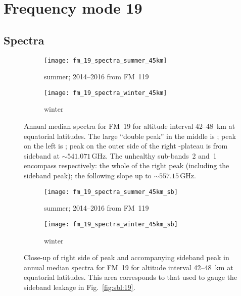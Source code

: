 \section{Frequency mode 19}
\label{FM19}
\subsection{Spectra}
\label{FM19:spectra}

\begin{figure}[ht]
    \centering
    \begin{subfigure}[b]{0.9545\textwidth}
        \texttt{[image: fm\_19\_spectra\_summer\_45km]}
        \caption{summer; 2014--2016 from FM~119}\label{fig:spectra:19:summer}
    \end{subfigure}
    \begin{subfigure}[b]{0.9545\textwidth}
        \texttt{[image: fm\_19\_spectra\_winter\_45km]}
        \caption{winter}\label{fig:spectra:19:winter}
    \end{subfigure}
    \caption{Annual median spectra for FM~19 for altitude interval 42--48~km
        at equatorial latitudes.  The large ``double peak'' in the middle is
        ; peak on the left is ; peak on the outer side of
        the right -plateau is  from sideband at
        $\sim541.071\,\mathrm{GHz}$.  The unhealthy sub-bands~2 and~1 encompass
        respectively: the whole of the right  peak (including the
        sideband peak); the following slope up to $\sim557.15\,\mathrm{GHz}$.
        }\label{fig:spectra:19}
\end{figure}

\begin{figure}[ht]
    \centering
    \begin{subfigure}[b]{0.9545\textwidth}
        \texttt{[image: fm\_19\_spectra\_summer\_45km\_sb]}
        \caption{summer; 2014--2016 from FM~119
            }\label{fig:spectra:19:summer:closeup}
    \end{subfigure}
    \begin{subfigure}[b]{0.9545\textwidth}
        \texttt{[image: fm\_19\_spectra\_winter\_45km\_sb]}
        \caption{winter}\label{fig:spectra:19:winter:closeup}
    \end{subfigure}
    \caption{Close-up of right side of  peak and accompanying
        sideband  peak in annual median spectra for FM~19
        for altitude interval 42--48~km at equatorial latitudes.  This area
        corresponds to that used to gauge the sideband leakage in
        Fig.~\ref{fig:sbl:19}.
        }\label{fig:spectra:19:closeup}
\end{figure}

